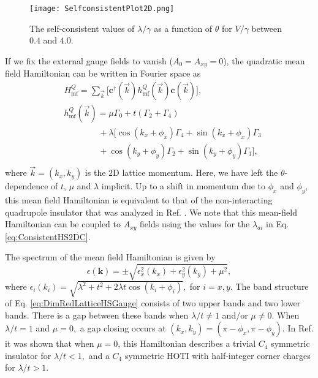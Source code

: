 \documentclass[prb,aps,twocolumn,groupaddress,floatfix]{revtex4-1}
\begin{document}
\begin{figure}\centering
\texttt{[image: SelfconsistentPlot2D.png]}
\caption{The self-consistent values of $\lambda/\gamma$ as a function of $\theta$ for $V/\gamma$ between $0.4$ and $4.0$.}\label{fig:consistentplot2}
\end{figure}

If we fix the external gauge fields to vanish ($A_0 = A_{xy} = 0$),  the quadratic mean field Hamiltonian can be written in Fourier space as 
\begin{equation}
\begin{split}
&H^{Q}_{\text{mf}} = \sum_{\vec{k}} \Big[ \bm{c}^\dagger(\vec{k}) h^Q_{\text{mf}}(\vec{k})\bm{c}(\vec{k}) \Big],\\
&h^Q_{\text{mf}}(\vec{k}) =\mu \Gamma_0 +t (\Gamma_2+\Gamma_4) \\
&\phantom{===}+ \lambda \big[\cos(k_x+\phi_{x})\Gamma_4 + \sin(k_x + \phi_{x}) \Gamma_3\\
&\phantom{===}+ \cos(k_y+\phi_{y})\Gamma_2 + \sin(k_y + \phi_{y}) \Gamma_1],\\
\end{split}\label{eq:DimRedLatticeHSGauge}
\end{equation}
where $\vec{k} = (k_x, k_y)$ is the $2$D lattice momentum. Here, we have left the $\theta$-dependence of $t$, $\mu$ and $\lambda$ implicit. Up to a shift in momentum due to $\phi_x$ and $\phi_y$, this mean field Hamiltonian is equivalent to that of the non-interacting quadrupole insulator that was analyzed in Ref. . We note that this mean-field  Hamiltonian can be coupled to $A_{xy}$ fields using the values for the $\lambda_{ai}$ in Eq. \ref{eq:ConsistentHS2DC}. 

The spectrum of the mean field Hamiltonian is given by
\begin{equation}
\epsilon(\bm{k}) = \pm\sqrt{\epsilon_x^2(k_x) + \epsilon_y^2(k_y) + \mu^2},
\end{equation}
where $\epsilon_i(k_i) = \sqrt{\lambda^2 + t^2 + 2\lambda t\cos(k_i + \phi_i)},$ for $i = x,y$. The band structure of Eq. \ref{eq:DimRedLatticeHSGauge} consists of two upper bands and two lower bands. There is a gap between these bands when $\lambda/t \neq 1$ and/or $\mu \neq 0$.  When $\lambda/t = 1$ and $\mu = 0,$ a gap closing occurs at $(k_x,k_y) = (\pi - \phi_x,\pi - \phi_y)$. In Ref.  it was shown that when $\mu = 0$, this Hamiltonian describes a trivial $C_4$ symmetric insulator for $\lambda/t < 1,$ and a $C_4$ symmetric HOTI with half-integer corner charges for $\lambda/t > 1$.  
\end{document}
